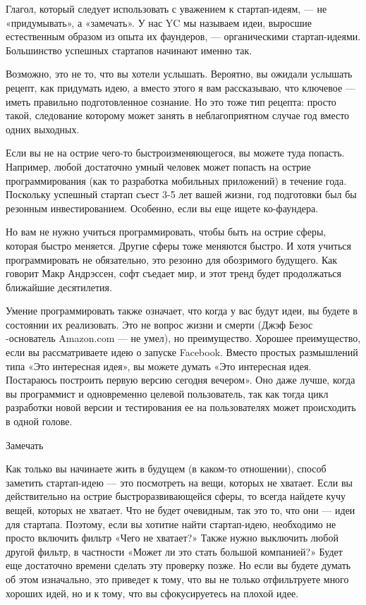 \documentclass[ebook,12pt,oneside,openany]{memoir}
\begin{document}
Глагол, который следует использовать с уважением к стартап-идеям, — не
«придумывать», а «замечать». У нас YC мы называем идеи, выросшие
естественным образом из опыта их фаундеров, — органическими
стартап-идеями. Большинство успешных стартапов начинают именно так.

Возможно, это не то, что вы хотели услышать. Вероятно, вы ожидали
услышать рецепт, как придумать идею, а вместо этого я вам рассказываю,
что ключевое — иметь правильно подготовленное сознание. Но это тоже
тип рецепта: просто такой, следование которому может занять в
неблагоприятном случае год вместо одних выходных.

Если вы не на острие чего-то быстроизменяющегося, вы можете туда
попасть. Например, любой достаточно умный человек может попасть на
острие программирования (как то разработка мобильных приложений) в
течение года. Поскольку успешный стартап съест 3-5 лет вашей жизни,
год подготовки был бы резонным инвестированием. Особенно, если вы еще
ищете ко-фаундера.

Но вам не нужно учиться программировать, чтобы быть на острие сферы,
которая быстро меняется. Другие сферы тоже меняются быстро. И хотя
учиться программировать не обязательно, это резонно для обозримого
будущего. Как говорит Макр Андрэссен, софт съедает мир, и этот тренд
будет продолжаться ближайшие десятилетия.

Умение программировать также означает, что когда у вас будут идеи, вы
будете в состоянии их реализовать. Это не вопрос жизни и смерти (Джэф
Безос -основатель Amazon.com — не умел), но преимущество. Хорошее
преимущество, если вы рассматриваете идею о запуске Facebook. Вместо
простых размышлений типа «Это интересная идея», вы можете думать «Это
интересная идея. Постараюсь построить первую версию сегодня вечером».
Оно даже лучше, когда вы программист и одновременно целевой
пользователь, так как тогда цикл разработки новой версии и
тестирования ее на пользователях может происходить в одной голове.

Замечать

Как только вы начинаете жить в будущем (в каком-то отношении), способ
заметить стартап-идею — это посмотреть на вещи, которых не хватает.
Если вы действительно на острие быстроразвивающейся сферы, то всегда
найдете кучу вещей, которых не хватает. Что не будет очевидным, так
это то, что они — идеи для стартапа. Поэтому, если вы хотитие найти
стартап-идею, необходимо не просто включить фильтр «Чего не хватает?»
Также нужно выключить любой другой фильтр, в частности «Может ли это
стать большой компанией?» Будет еще достаточно времени сделать эту
проверку позже. Но если вы будете думать об этом изначально, это
приведет к тому, что вы не только отфильтруете много хороших идей, но
и к тому, что вы сфокусируетесь на плохой идее.
\end{document}
